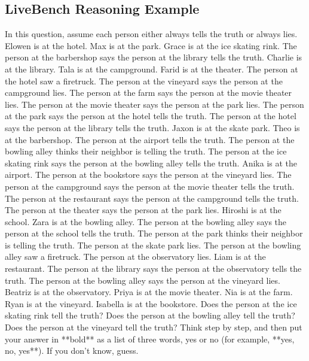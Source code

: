 





















\subsection{LiveBench Reasoning Example}
\begin{tcolorbox}[title=Question, breakable]

In this question, assume each person either always tells the truth or always lies. Elowen is at the hotel. Max is at the park. Grace is at the ice skating rink. The person at the barbershop says the person at the library tells the truth. Charlie is at the library. Tala is at the campground. Farid is at the theater. The person at the hotel saw a firetruck. The person at the vineyard says the person at the campground lies. The person at the farm says the person at the movie theater lies. The person at the movie theater says the person at the park lies. The person at the park says the person at the hotel tells the truth. The person at the hotel says the person at the library tells the truth. Jaxon is at the skate park. Theo is at the barbershop. The person at the airport tells the truth. The person at the bowling alley thinks their neighbor is telling the truth. The person at the ice skating rink says the person at the bowling alley tells the truth. Anika is at the airport. The person at the bookstore says the person at the vineyard lies. The person at the campground says the person at the movie theater tells the truth. The person at the restaurant says the person at the campground tells the truth. The person at the theater says the person at the park lies. Hiroshi is at the school. Zara is at the bowling alley. The person at the bowling alley says the person at the school tells the truth. The person at the park thinks their neighbor is telling the truth. The person at the skate park lies. The person at the bowling alley saw a firetruck. The person at the observatory lies. Liam is at the restaurant. The person at the library says the person at the observatory tells the truth. The person at the bowling alley says the person at the vineyard lies. Beatriz is at the observatory. Priya is at the movie theater. Nia is at the farm. Ryan is at the vineyard. Isabella is at the bookstore. Does the person at the ice skating rink tell the truth? Does the person at the bowling alley tell the truth? Does the person at the vineyard tell the truth? Think step by step, and then put your answer in **bold** as a list of three words, yes or no (for example, **yes, no, yes**). If you don't know, guess.

\end{tcolorbox}
